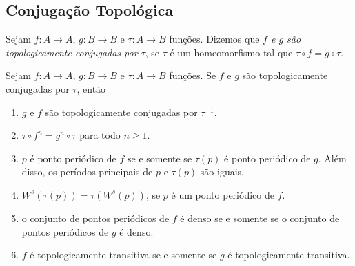 \subsection{Conjugação Topológica}


\begin{definition}
Sejam $f: A \to A$, $g: B \to B$ e $\tau: A \to B$ funções. Dizemos que \textit{$f$ e $g$ são topologicamente conjugadas por $\tau$}, se $\tau$ é um homeomorfismo tal que $\tau \circ f = g \circ \tau$.
\end{definition}


\begin{proposition}
\label{proposicao conjugacaotopologica 1}
Sejam $f: A \to A$, $g: B \to B$ e $\tau: A \to B$ funções. Se $f$ e $g$ são topologicamente conjugadas por $\tau$, então
\begin{enumerate}
\item $g$ e $f$ são topologicamente conjugadas por $\tau^{-1}$.
\item $\tau \circ f^n = g^n \circ \tau$ para todo $n \geq 1$.
\item $p$ é ponto periódico de $f$ se e somente se $\tau(p)$ é ponto periódico de $g$. Além disso, os períodos principais de $p$ e $\tau(p)$ são iguais.
\item $W^s(\tau(p)) = \tau(W^s(p))$, se $p$ é um ponto periódico de $f$.
\item o conjunto de pontos periódicos de $f$ é denso se e somente se o conjunto de pontos periódicos de $g$ é denso.
\item $f$ é topologicamente transitiva se e somente se $g$ é topologicamente transitiva.
\end{enumerate}
\end{proposition}

